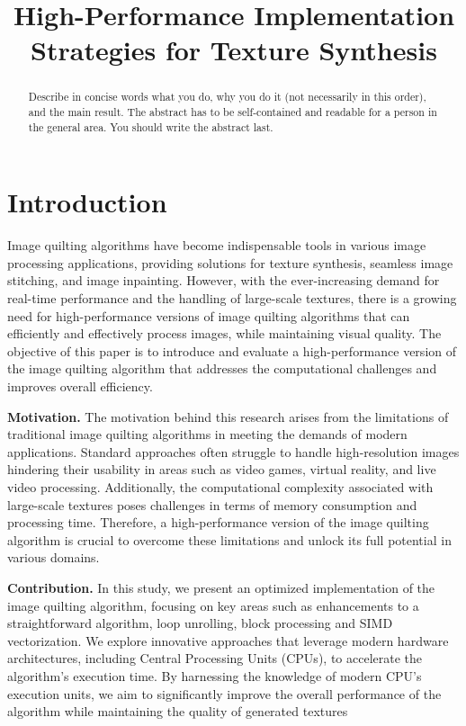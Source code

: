 \documentclass[letterpaper]{article}
\title{High-Performance Implementation Strategies for Texture Synthesis}
\newcommand{\mypar}[1]{{\bf #1.}}
\begin{document}
%
\maketitle
%

\begin{abstract}
Describe in concise words what you do, why you do it (not necessarily
in this order), and the main result. The abstract has to be
self-contained and readable for a person in the general area. You
should write the abstract last.
\end{abstract}

\section{Introduction}\label{sec:intro}

Image quilting algorithms have become indispensable tools in various image processing applications, providing solutions for texture synthesis, seamless image stitching, and image inpainting. However, with the ever-increasing demand for real-time performance and the handling of large-scale textures, there is a growing need for high-performance versions of image quilting algorithms that can efficiently and effectively process images, while maintaining visual quality. The objective of this paper is to introduce and evaluate a high-performance version of the image quilting algorithm that addresses the computational challenges and improves overall efficiency. 

\mypar{Motivation} The motivation behind this research arises from the limitations of traditional image quilting algorithms in meeting the demands of modern applications. Standard approaches often struggle to handle high-resolution images hindering their usability in areas such as video games, virtual reality, and live video processing. Additionally, the computational complexity associated with large-scale textures poses challenges in terms of memory consumption and processing time. Therefore, a high-performance version of the image quilting algorithm is crucial to overcome these limitations and unlock its full potential in various domains.

\mypar{Contribution}
In this study, we present an optimized implementation of the image quilting algorithm, focusing on key areas such as enhancements to a straightforward algorithm, loop unrolling, block processing and SIMD vectorization. We explore innovative approaches that leverage modern hardware architectures, including Central Processing Units (CPUs), to accelerate the algorithm's execution time. By harnessing the knowledge of modern CPU's execution units, we aim to significantly improve the overall performance of the algorithm while maintaining the quality of generated textures
\end{document}
